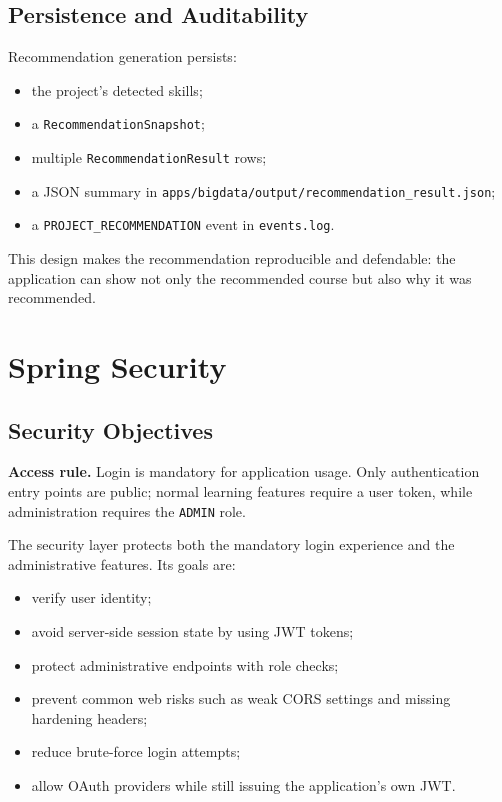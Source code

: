 \documentclass[12pt,a4paper]{report}
\newcommand{\reportnote}[2]{
    \begin{tcolorbox}[
        enhanced,
        colback=#1!10,
        colframe=#1,
        arc=2pt,
        boxrule=0.7pt,
        left=8pt,
        right=8pt,
        top=7pt,
        bottom=7pt
    ]
    #2
    \end{tcolorbox}
}
\begin{document}
\section{Persistence and Auditability}
Recommendation generation persists:
\begin{itemize}[leftmargin=*]
    \item the project's detected skills;
    \item a \texttt{RecommendationSnapshot};
    \item multiple \texttt{RecommendationResult} rows;
    \item a JSON summary in \texttt{apps/bigdata/output/recommendation\_result.json};
    \item a \texttt{PROJECT\_RECOMMENDATION} event in \texttt{events.log}.
\end{itemize}

This design makes the recommendation reproducible and defendable: the application can show not only the recommended course but also why it was recommended.

\chapter{Spring Security}

\section{Security Objectives}
\reportnote{sbTeal}{\textbf{Access rule.} Login is mandatory for application usage. Only authentication entry points are public; normal learning features require a user token, while administration requires the \texttt{ADMIN} role.}

The security layer protects both the mandatory login experience and the administrative features. Its goals are:

\begin{itemize}[leftmargin=*]
    \item verify user identity;
    \item avoid server-side session state by using JWT tokens;
    \item protect administrative endpoints with role checks;
    \item prevent common web risks such as weak CORS settings and missing hardening headers;
    \item reduce brute-force login attempts;
    \item allow OAuth providers while still issuing the application's own JWT.
\end{itemize}
\end{document}
